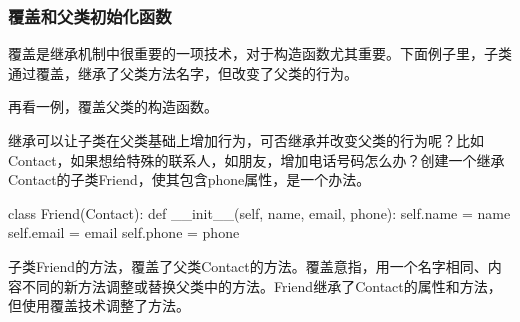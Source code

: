 









\subsubsection{覆盖和父类初始化函数}
覆盖是继承机制中很重要的一项技术，对于构造函数尤其重要。下面例子里，子类通过覆盖，继承了父类方法名字，但改变了父类的行为。

再看一例，覆盖父类的构造函数。

继承可以让子类在父类基础上增加行为，可否继承并改变父类的行为呢？比如Contact，如果想给特殊的联系人，如朋友，增加电话号码怎么办？创建一个继承Contact的子类Friend，使其包含phone属性，是一个办法。
\begin{python}
class Friend(Contact):
    def __init__(self, name, email, phone):
        self.name = name
        self.email = email
        self.phone = phone
\end{python}
子类Friend的方法，覆盖了父类Contact的方法。覆盖意指，用一个名字相同、内容不同的新方法调整或替换父类中的方法。Friend继承了Contact的属性和方法，但使用覆盖技术调整了方法。

